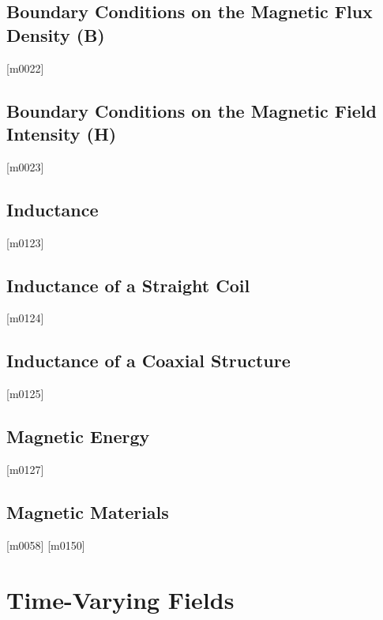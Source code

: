 \documentclass[10pt,letterpaper,twocolumn,openany]{book}
\theoremstyle{definition} %
\begin{document}
    \section{Boundary Conditions on the Magnetic Flux Density ({\bf B})}
{\color{blue}\tiny[m0022]}      
      \vfill\break
    \section{Boundary Conditions on the Magnetic Field Intensity ({\bf H})}
{\color{blue}\tiny[m0023]}      
      \vfill\break
    \section{Inductance}
{\color{blue}\tiny[m0123]}      
      \vfill\break
    \section{Inductance of a Straight Coil}
{\color{blue}\tiny[m0124]}      
      \vfill\break
    \section{Inductance of a Coaxial Structure}
{\color{blue}\tiny[m0125]}      
      \vfill\break
    \section{Magnetic Energy}
{\color{blue}\tiny[m0127]}      
      \vfill\break
    \section{Magnetic Materials}
{\color{blue}\tiny[m0058]}      
      \vfill\break
{\color{blue}\tiny[m0150]}    
  \chapter{Time-Varying Fields}
  \thispagestyle{fancy} %
  \fancyhf{}            %
\end{document}
